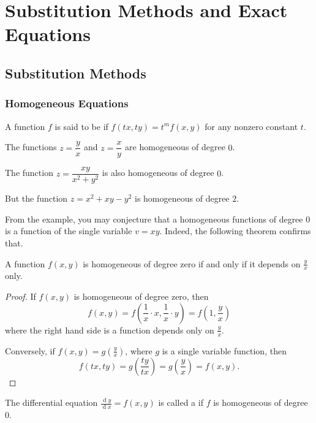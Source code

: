 \chapter{Substitution Methods and Exact Equations}

\section{Substitution Methods}
\subsection{Homogeneous Equations}

\begin{definition}
  A function $f$ is said to be  if $f(tx, ty)=t^mf(x, y)$ for any nonzero constant $t$.
\end{definition}

\begin{example}
  The functions $z=\dfrac{y}{x}$ and $z=\dfrac{x}{y}$ are homogeneous of degree $0$.
  
  The function $z=\dfrac{xy}{x^2+y^2}$ is also homogeneous of degree $0$.

  But the function $z=x^2+xy-y^2$ is homogeneous of degree $2$.
\end{example}

From the example, you may conjecture that a homogeneous functions of degree $0$ is  a function of the single variable $v=xy$. 
Indeed, the following theorem confirms that.

\begin{theorem}\label{thm:homegeneity}
  A function $f(x, y)$ is homogeneous of degree zero if and only if it depends on $\frac yx$ only.
\end{theorem}
\begin{proof}
  If $f(x, y)$ is homogeneous of degree zero, then \[f(x, y)=f\left(\frac{1}x\cdot x, \frac{1}{x}\cdot y\right)=f\left(1, \frac{y}{x}\right)\]
  where the right hand side is a function depends only on $\frac yx$.

  Conversely, if $f(x, y)=g\left(\frac yx\right)$, where $g$ is a single variable function, then
  \[f(tx, ty)=g\left(\frac{ty}{tx}\right)=g\left(\frac yx\right)=f(x, y).\]
\end{proof}

\begin{definition}
  The differential equation $\frac{\operatorname{d} y}{\operatorname{d} x}=f(x, y)$ is called a  if $f$ is homogeneous of degree $0$.
\end{definition}

